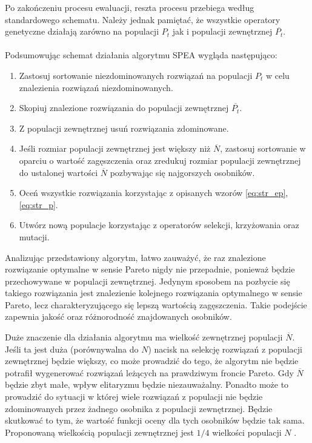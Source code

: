 \documentclass[twoside]{iisthesis}
\begin{document}
Po zakończeniu procesu ewaluacji, reszta procesu przebiega według standardowego schematu. Należy jednak pamiętać, że wszystkie operatory genetyczne działają zarówno na populacji $P_{t}$ jak i populacji zewnętrznej $\overline{P_{t}}$.\\\\
Podsumowując schemat działania algorytmu SPEA wygląda następująco:\\
\begin{enumerate}
	\item Zastosuj sortowanie niezdominowanych rozwiązań na populacji $P_{t}$ w celu znalezienia rozwiązań niezdominowanych.
	\item Skopiuj znalezione rozwiązania do populacji zewnętrznej $\overline{P_{t}}$.
	\item Z populacji zewnętrznej usuń rozwiązania zdominowane.
	\item Jeśli rozmiar populacji zewnętrznej jest większy niż $\overline{N}$, zastosuj sortowanie w oparciu o wartość zagęszczenia oraz zredukuj rozmiar populacji zewnętrznej do ustalonej wartości $\overline{N}$ pozbywając się najgorszych osobników.
	\item Oceń wszystkie rozwiązania korzystając z opisanych wzorów \eqref{eq:str_ep}, \eqref{eq:str_p}.
	\item Utwórz nową populacje korzystając z operatorów selekcji, krzyżowania oraz mutacji.\\
\end{enumerate}

Analizując przedstawiony algorytm, łatwo zauważyć, że raz znalezione rozwiązanie optymalne w sensie Pareto nigdy nie przepadnie, ponieważ będzie przechowywane w populacji zewnętrznej. Jedynym sposobem na pozbycie się takiego rozwiązania jest znalezienie kolejnego rozwiązania optymalnego w sensie Pareto, lecz charakteryzującego się lepszą wartością zagęszczenia. Takie podejście zapewnia jakość oraz różnorodność znajdowanych osobników.

Duże znaczenie dla działania algorytmu ma wielkość zewnętrznej populacji $\overline{N}$. Jeśli ta jest duża (porównywalna do $N$)  nacisk na selekcję rozwiązań z populacji zewnętrznej będzie większy, co może prowadzić do tego, że algorytm nie będzie potrafił wygenerować rozwiązań leżących na prawdziwym froncie Pareto. Gdy $\overline{N}$ będzie zbyt małe, wpływ elitaryzmu będzie niezauważalny. Ponadto może to prowadzić do sytuacji w której wiele rozwiązań z populacji nie będzie zdominowanych przez żadnego osobnika z populacji zewnętrznej. Będzie skutkować to tym, że wartość funkcji oceny dla tych osobników będzie tak sama. Proponowaną wielkością populacji zewnętrznej jest $1/4$ wielkości populacji $N$ \cite{book}.
\end{document}
